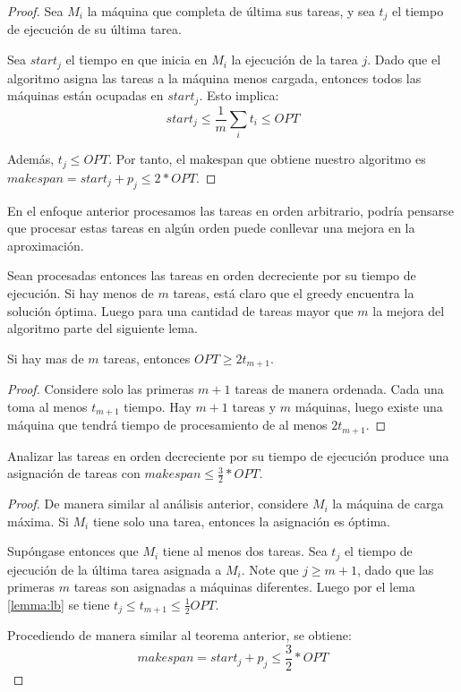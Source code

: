 \documentclass[../np-approximations.tex]{subfiles}
\begin{document}
\begin{proof}
	Sea $M_i$ la máquina que completa de última sus tareas, y sea 
	$t_j$ el tiempo de ejecución de su última tarea.
											
	Sea $start_j$ el tiempo en que inicia en $M_i$ la ejecución de 
	la tarea $j$. Dado que el algoritmo asigna las tareas a la 
	máquina menos cargada, entonces todos las máquinas están 
	ocupadas en $start_j$. Esto implica:
	\begin{equation*}
		start_j \le \frac{1}{m}\sum_i t_i \le OPT
	\end{equation*}
											
	Además, $t_j \le OPT$. Por tanto, el makespan que obtiene 
	nuestro algoritmo es $makespan = start_j + p_j \le 2*OPT$.
\end{proof}

En el enfoque anterior procesamos las tareas en orden arbitrario,
podría pensarse que procesar estas tareas en algún orden puede
conllevar una mejora en la aproximación.

Sean procesadas entonces las tareas en orden decreciente por su 
tiempo de ejecución. Si hay menos de $m$ tareas, está claro que el 
greedy encuentra la solución óptima. Luego para una cantidad de 
tareas mayor que $m$ la mejora del algoritmo parte del siguiente 
lema.

\begin{lemma}
	\label{lemma:lb}
	Si hay mas de $m$ tareas, entonces $OPT \ge 2t_{m+1}$.
\end{lemma}

\begin{proof}
	Considere solo las primeras $m+1$ tareas de manera ordenada. 
	Cada una toma al menos $t_{m+1}$ tiempo. Hay $m+1$ tareas y $m$ 
	máquinas, luego existe una máquina que tendrá tiempo de 
	procesamiento de al menos $2t_{m+1}$.
\end{proof}

\begin{theorem}
	Analizar las tareas en orden decreciente por su tiempo de 
	ejecución produce una asignación de tareas con
	$makespan \le \frac{3}{2}*OPT$.
\end{theorem}

\begin{proof}
	De manera similar al análisis anterior, considere $M_i$ la 
	máquina de carga máxima. Si $M_i$ tiene solo una tarea, entonces
	la asignación es óptima.
											
	Supóngase entonces que $M_i$ tiene al menos dos tareas. Sea 
	$t_j$ el tiempo de ejecución de la última tarea asignada a 
	$M_i$. Note que $j \ge m+1$, dado que las primeras $m$ tareas 
	son asignadas a máquinas diferentes. Luego por el lema 
	\ref{lemma:lb} se tiene $t_j \le t_{m+1} \le \frac{1}{2}OPT$.
											
	Procediendo de manera similar al teorema anterior, se obtiene:
	$$makespan = start_j + p_j \le \frac{3}{2}*OPT$$
\end{proof}
\end{document}

